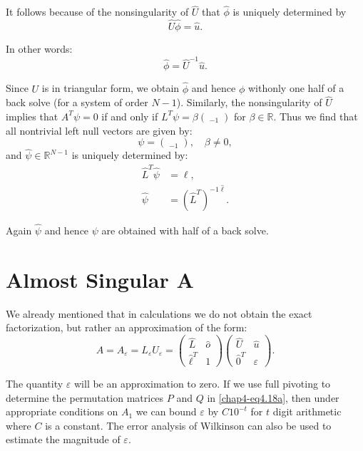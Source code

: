 It follows because of the nonsingularity  of $\hat{U}$ that
$\hat{\phi}$ is uniquely determined by  
$$
\hat{U}\hat{\phi}= \hat{u}. 
$$

In other words:
$$
\hat{\phi}= \hat{U}^{-1}\hat{u}. 
$$

Since $U$ is  in triangular form, we obtain $\hat{\phi}$ and hence
$\phi$ with\pageoriginale only one half of a back solve (for a system
of order $N-1$). Similarly, the nonsingularity of $\hat{U}$ implies that
$A^T \psi = 0$ if and only if $L^T \psi = \beta
\left(\displaystyle{\mathop{\hat{0}}_{-1}} \right)$ 
for $\beta \in  \mathbb{R}$. Thus we find that all nontrivial
left null vectors are given by: 
\begin{equation*}
\psi = \left(\displaystyle{\mathop{\hat{\psi}}_{-1}} \right),
\quad \beta \neq 0, \tag{4.19b}\label{chap4-eq4.19b}
\end{equation*}
and $\hat{\psi} \in  \mathbb{R}^{N-1}$  is uniquely
determined by: 
\begin{align*}
\hat{L}^T \hat{\psi}&= \ell,\\
\hat{\psi} & = (\hat{L}^T)^{-1\hat{\ell}}.
\end{align*}

Again $\hat{\psi}$ and hence $\psi$ are obtained with half of a
back solve.  

\section*{Almost Singular A}%

We already  mentioned that in calculations we do not obtain the exact
factorization, but  rather an approximation of the form: 
\begin{equation*}
A=A_\varepsilon  = L_\varepsilon  U_\varepsilon  = 
	\begin{pmatrix}
\hat{L}&\hat{o}\\
\hat{\ell}^T& 1
	\end{pmatrix}	
	\begin{pmatrix}
\hat{U}&\hat{u}\\
\hat{0}^T&\varepsilon  
	\end{pmatrix}.	 \tag{4.20}\label{chap4-eq4.20} 
\end{equation*}

The quantity $\varepsilon  $ will be an approximation to   zero. If we
use full pivoting to determine the permutation matrices $P$ and $Q$
in \eqref{chap4-eq4.18a}, then under appropriate conditions on $A_1$
we can bound 
$\varepsilon $ by $C10^{-t}$ for $t$ digit  arithmetic where $C$ is a
constant. The error analysis of Wilkinson \cite{key32} can also be used to
estimate the magnitude of $\varepsilon$. 

